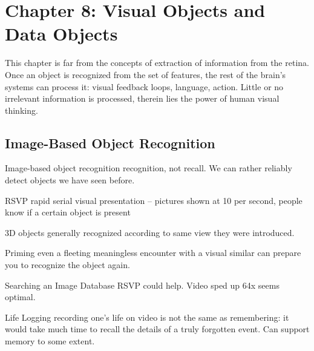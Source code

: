 \section{Chapter 8: Visual Objects and Data Objects}
\graphicspath{ {pngs/ch8/} }

\secttoc

This chapter is far from the concepts of extraction of information from the
retina. Once an object is recognized from the set of features, the rest of the
brain's systems can process it: visual feedback loops, language, action.
Little or no irrelevant information is processed, therein lies the power of
human visual thinking.

\begin{mdframed}\begin{multicols}{2}
\subsection{Image-Based Object Recognition}
\begin{compactdesc}
    \item[Image-based object recognition] recognition, not recall. We can
        rather reliably detect objects we have seen before.
    \item[RSVP] rapid serial visual presentation -- pictures shown at 10 per
        second, people know if a certain object is present
    \item[3D objects] generally recognized according to same view they were
        introduced.
    \item[Priming] even a fleeting meaningless encounter with a visual
        similar can prepare you to recognize the object again.
    \item[Searching an Image Database] RSVP could help. Video sped up 64x
        seems optimal.
    \item[Life Logging] recording one's life on video is not the same as
        remembering: it would take much time to recall the details of a truly
        forgotten event. Can support memory to some extent.
\end{compactdesc}
\end{multicols}\end{mdframed}

